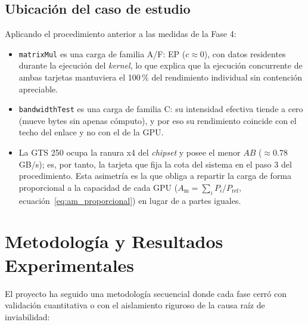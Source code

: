 \documentclass[a4paper,11pt]{article}
\begin{document}
\subsection{Ubicación del caso de estudio}

Aplicando el procedimiento anterior a las medidas de la Fase 4:
\begin{itemize}[leftmargin=*,itemsep=2pt]
    \item \texttt{matrixMul} es una carga de familia A/F: EP ($c \approx 0$), con datos residentes durante la ejecución del
    \textit{kernel}, lo que explica que la ejecución concurrente de ambas tarjetas mantuviera el 100\,\% del rendimiento
    individual sin contención apreciable.
    \item \texttt{bandwidthTest} es una carga de familia C: su intensidad efectiva tiende a cero (mueve bytes sin apenas
    cómputo), y por eso su rendimiento coincide con el techo del enlace y no con el de la GPU.
    \item La GTS 250 ocupa la ranura x4 del \textit{chipset} y posee el menor $AB$ ($\approx 0.78$ GB/s); es, por tanto, la
    tarjeta que fija la cota del sistema en el paso 3 del procedimiento. Esta asimetría es la que obliga a repartir la carga
    de forma proporcional a la capacidad de cada GPU ($A_{\text{m}} = \sum_i P_i / P_{\text{ref}}$,
    ecuación~\eqref{eq:am_proporcional}) en lugar de a partes iguales.
\end{itemize}

\section{Metodología y Resultados Experimentales}

El proyecto ha seguido una metodología secuencial donde cada fase cerró con validación cuantitativa o con el aislamiento riguroso de la causa raíz de inviabilidad:
\end{document}
